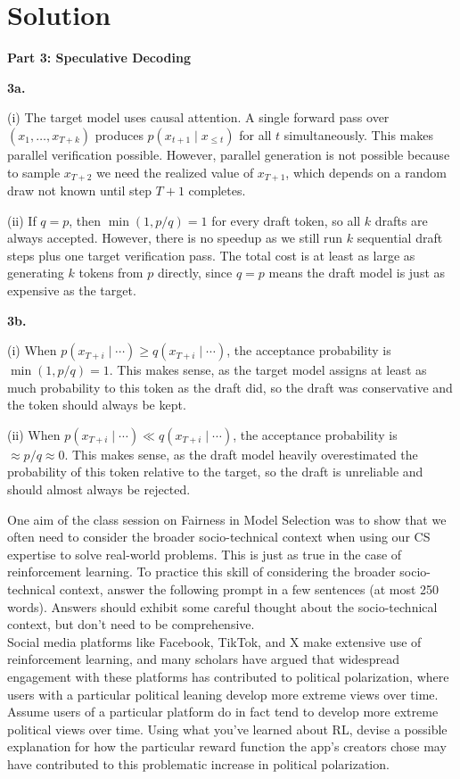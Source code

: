 \documentclass[submit]{../harvardml}
\newenvironment{solution}
  {\color{blue}\section*{Solution}}
{}
\begin{document}
\begin{solution}
\bigskip
\textbf{Part 3: Speculative Decoding}

\textbf{3a.}

(i) The target model uses causal attention. A single forward pass over $(x_1, \ldots, x_{T+k})$ produces $p(x_{t+1} \mid x_{\le t})$ for all $t$ simultaneously. This makes parallel verification possible. However, parallel generation is not possible because to sample $x_{T+2}$ we need the realized value of $x_{T+1}$, which depends on a random draw not known until step $T+1$ completes.

(ii) If $q = p$, then $\min(1, p/q) = 1$ for every draft token, so all $k$ drafts are always accepted. However, there is no speedup as we still run $k$ sequential draft steps plus one target verification pass. The total cost is at least as large as generating $k$ tokens from $p$ directly, since $q = p$ means the draft model is just as expensive as the target.

\textbf{3b.}

(i) When $p(x_{T+i} \mid \cdots) \ge q(x_{T+i} \mid \cdots)$, the acceptance probability is $\min(1, p/q) = 1$. This makes sense, as the target model assigns at least as much probability to this token as the draft did, so the draft was conservative and the token should always be kept.

(ii) When $p(x_{T+i} \mid \cdots) \ll q(x_{T+i} \mid \cdots)$, the acceptance probability is $\approx p/q \approx 0$. This makes sense, as the draft model heavily overestimated the probability of this token relative to the target, so the draft is unreliable and should almost always be rejected.

\end{solution}

\newpage

\begin{problem}
    One aim of the class session on Fairness in Model Selection was to show that we often need to consider the broader socio-technical context when using our CS expertise to solve real-world problems. This is just as true in the case of reinforcement learning. To practice this skill of considering the broader socio-technical context, answer the following prompt in a few sentences (at most 250 words). Answers should exhibit some careful thought about the socio-technical context, but don't need to be comprehensive. \\

    \noindent Social media platforms like Facebook, TikTok, and X make extensive use of reinforcement learning, and many scholars have argued that widespread engagement with these platforms has contributed to political polarization, where users with a particular political leaning develop more extreme views over time. Assume users of a particular platform do in fact tend to develop more extreme political views over time. Using what you've learned about RL, devise a possible explanation for how the particular reward function the app's creators chose may have contributed to this problematic increase in political polarization.
\end{problem}
\end{document}
